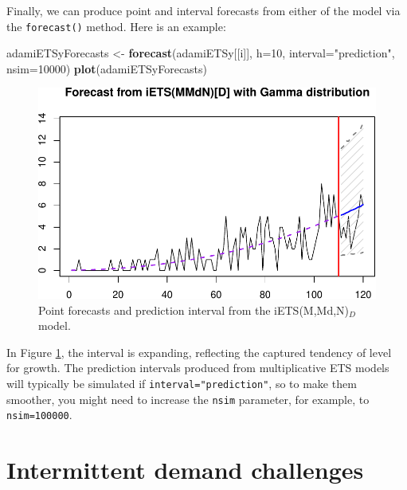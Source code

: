 \documentclass[]{book}
\newenvironment{Shaded}{\begin{snugshade}}{\end{snugshade}}
\newcommand{\DataTypeTok}[1]{\textcolor[rgb]{0.13,0.29,0.53}{#1}}
\newcommand{\DecValTok}[1]{\textcolor[rgb]{0.00,0.00,0.81}{#1}}
\newcommand{\KeywordTok}[1]{\textcolor[rgb]{0.13,0.29,0.53}{\textbf{#1}}}
\newcommand{\NormalTok}[1]{#1}
\newcommand{\StringTok}[1]{\textcolor[rgb]{0.31,0.60,0.02}{#1}}
\theoremstyle{definition}
\theoremstyle{definition}
\theoremstyle{definition}
\theoremstyle{definition}
\theoremstyle{remark}
\begin{document}
Finally, we can produce point and interval forecasts from either of the model via the \texttt{forecast()} method. Here is an example:

\begin{Shaded}
\begin{Highlighting}[]
\NormalTok{adamiETSyForecasts <-}\StringTok{ }\KeywordTok{forecast}\NormalTok{(adamiETSy[[i]], }\DataTypeTok{h=}\DecValTok{10}\NormalTok{,}
                               \DataTypeTok{interval=}\StringTok{"prediction"}\NormalTok{, }\DataTypeTok{nsim=}\DecValTok{10000}\NormalTok{)}
\KeywordTok{plot}\NormalTok{(adamiETSyForecasts)}
\end{Highlighting}
\end{Shaded}

\begin{figure}
\centering
\includegraphics{Svetunkov--2022----ADAM_files/figure-latex/adamiETSyForecasts-1.pdf}
\caption{\label{fig:adamiETSyForecasts}Point forecasts and prediction interval from the iETS(M,Md,N)\(_D\) model.}
\end{figure}

In Figure \ref{fig:adamiETSyForecasts}, the interval is expanding, reflecting the captured tendency of level for growth. The prediction intervals produced from multiplicative ETS models will typically be simulated if \texttt{interval="prediction"}, so to make them smoother, you might need to increase the \texttt{nsim} parameter, for example, to \texttt{nsim=100000}.

\hypertarget{intermittent-demand-challenges}{%
\section{Intermittent demand challenges}\label{intermittent-demand-challenges}}
\end{document}
